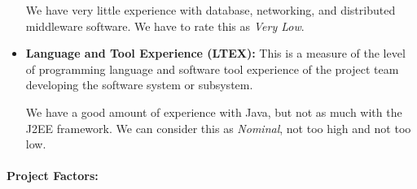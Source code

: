 \documentclass[english]{article}
\begin{document}
\begin{itemize}
We have very little experience with database, networking, and distributed middleware software. We have to rate this as \textit{Very Low}.


\item \textbf{Language and Tool Experience (LTEX):} This is a measure of the level of programming language and software tool experience of the project team developing the software system or subsystem.

We have a good amount of experience with Java, but not as much with the J2EE framework. We can consider this as \textit{Nominal}, not too high and not too low.


\end{itemize}

\paragraph{Project Factors:}
\end{document}
